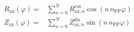 \documentclass[a4paper, 12pt]{article}
\begin{document}
\begin{align*}
R_\mathrm{ax}(\varphi) =& \sum\limits_{n=0}^{N}   R_{\mathrm{ax}, n}^\mathrm{cos} \cos \left( n \, n_\mathrm{FP} \varphi \right) \\
Z_\mathrm{ax}(\varphi) =& \sum\limits_{n=0}^{N}   Z_{\mathrm{ax}, n}^\mathrm{sin} \sin \left( n \, n_\mathrm{FP} \varphi \right)
\end{align*}
\end{document}
